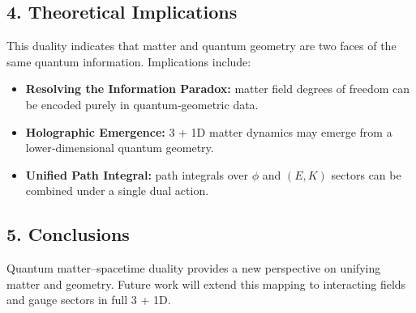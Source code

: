 \documentclass[12pt]{article}
\begin{document}
\subsection*{4. Theoretical Implications}
This duality indicates that matter and quantum geometry are two faces of the same quantum information.  Implications include:
\begin{itemize}
  \item \textbf{Resolving the Information Paradox:} matter field degrees of freedom can be encoded purely in quantum‐geometric data.  
  \item \textbf{Holographic Emergence:} 3 + 1D matter dynamics may emerge from a lower‐dimensional quantum geometry.  
  \item \textbf{Unified Path Integral:}  path integrals over $\phi$ and $(E,K)$ sectors can be combined under a single dual action.
\end{itemize}

\subsection*{5. Conclusions}
Quantum matter–spacetime duality provides a new perspective on unifying matter and geometry.  Future work will extend this mapping to interacting fields and gauge sectors in full 3 + 1D.
\end{document}
